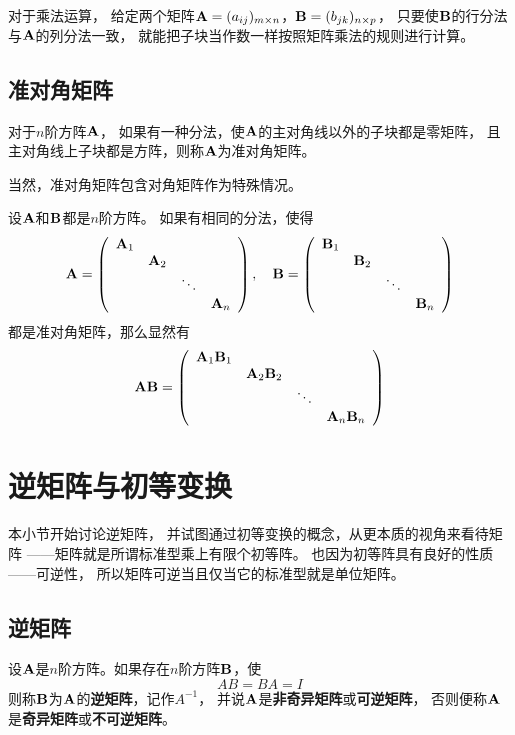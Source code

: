 对于乘法运算，
给定两个矩阵$\mmA=(a_{ij})_{m\times n}$，$\mmB=(b_{jk})_{n\times p}$，
只要使$\mmB$的行分法与$\mmA$的列分法一致，
就能把子块当作数一样按照矩阵乘法的规则进行计算。

\subsection{准对角矩阵}
\begin{definition}[准对角矩阵]
  对于$n$阶方阵$\mmA$，
  如果有一种分法，使$\mmA$的主对角线以外的子块都是零矩阵，
  且主对角线上子块都是方阵，则称$\mmA$为准对角矩阵。
\end{definition}

\begin{remark}
  当然，准对角矩阵包含对角矩阵作为特殊情况。
\end{remark}

设$\mmA$和$\mmB$都是$n$阶方阵。
如果有相同的分法，使得
\[
\mmA = \mmat{cccc}{
  \mmA_1 &        &        & \\
         & \mmA_2 &        & \\
         &        & \ddots & \\
         &        &        & \mmA_n },\quad
\mmB = \mmat{cccc}{
  \mmB_1 &        &        & \\
         & \mmB_2 &        & \\
         &        & \ddots & \\
         &        &        & \mmB_n }
\]
都是准对角矩阵，那么显然有
\[
\mmA\mmB = \mmat{cccc}{
    \mmA_1\mmB_1 &              &        & \\
                 & \mmA_2\mmB_2 &        & \\
                 &              & \ddots & \\
                 &              &        & \mmA_n\mmB_n }
\]

\section{逆矩阵与初等变换}
本小节开始讨论逆矩阵，
并试图通过初等变换的概念，从更本质的视角来看待矩阵
——矩阵就是所谓标准型乘上有限个初等阵。
也因为初等阵具有良好的性质——可逆性，
所以矩阵可逆当且仅当它的标准型就是单位矩阵。

\subsection{逆矩阵}
\begin{definition}[逆矩阵]
  设$\mmA$是$n$阶方阵。如果存在$n$阶方阵$\mmB$，使
  \begin{equation}
    AB=BA=I
  \end{equation}
  则称$\mmB$为$\mmA$的\textbf{逆矩阵}，记作$A^{-1}$，
  并说$\mmA$是\textbf{非奇异矩阵}或\textbf{可逆矩阵}，
  否则便称$\mmA$是\textbf{奇异矩阵}或\textbf{不可逆矩阵}。
\end{definition}

